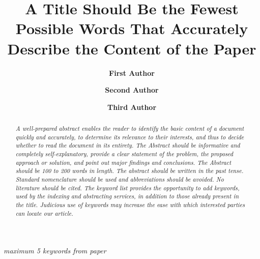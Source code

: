 \documentclass{iaesarticle3ol}
\author[*]{\bfseries First Author}
\author[ ]{\bfseries Second Author}
\author[ ]{\bfseries Third Author}
\affil[ ]{Institution/affiliation}
\affil[ ]{addres, telp/fax of institution/affiliation}
\affil[*]{corresponding author, e-mail: xxxx@xxxx.xxx}
\title{A Title Should Be the Fewest Possible Words That Accurately Describe the Content of the Paper}
\begin{document}
\setlength{\parindent}{1.27cm}

\pagestyle{fancy}
\fancyhfoffset{0cm}


\maketitle


\begin{abstract}
\textit{\indent
A well-prepared abstract enables the reader to identify the basic content of a document quickly and accurately, to determine its relevance to their interests, and thus to decide whether to read the document in its entirety. The Abstract should be informative and completely self-explanatory, provide a clear statement of the problem, the proposed approach or solution, and point out major findings and conclusions. The Abstract should be 100 to 200 words in length. The abstract should be written in the past tense. Standard nomenclature should be used and abbreviations should be avoided. No literature should be cited. The keyword list provides the opportunity to add keywords, used by the indexing and abstracting services, in addition to those already present in the title. Judicious use of keywords may increase the ease with which interested parties can locate our article.
}
\end{abstract}

\begin{keyword}
\textit{
maximum 5 keywords from paper
}
\end{keyword}


\end{document}
